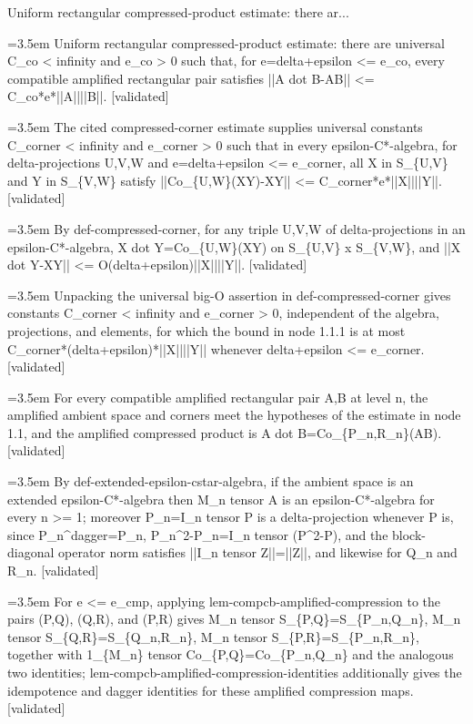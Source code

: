 \documentclass{article}
\newcommand{\step}[1]{\par\noindent\hangindent=3.5em\hangafter=1%
  \makebox[3.5em][l]{\textbf{#1.}}}
\newcommand{\steptag}[1]{\hfill{\small\textsf{[#1]}}}
\begin{document}
\begin{proofbox}{Uniform rectangular compressed-product estimate: there ar...}
\step{1} Uniform rectangular compressed-product estimate: there are universal C\_co < infinity and e\_co > 0 such that, for e=delta+epsilon <= e\_co, every compatible amplified rectangular pair satisfies ||A dot B-AB|| <= C\_co*e*||A||||B||. \steptag{validated} \\[6pt]
\step{1.1} The cited compressed-corner estimate supplies universal constants C\_corner < infinity and e\_corner > 0 such that in every epsilon-C*-algebra, for delta-projections U,V,W and e=delta+epsilon <= e\_corner, all X in S\_\{U,V\} and Y in S\_\{V,W\} satisfy ||Co\_\{U,W\}(XY)-XY|| <= C\_corner*e*||X||||Y||. \steptag{validated} \\[6pt]
\step{1.1.1} By def-compressed-corner, for any triple U,V,W of delta-projections in an epsilon-C*-algebra, X dot Y=Co\_\{U,W\}(XY) on S\_\{U,V\} x S\_\{V,W\}, and ||X dot Y-XY|| <= O(delta+epsilon)||X||||Y||. \steptag{validated} \\[4pt]
\step{1.1.2} Unpacking the universal big-O assertion in def-compressed-corner gives constants C\_corner < infinity and e\_corner > 0, independent of the algebra, projections, and elements, for which the bound in node 1.1.1 is at most C\_corner*(delta+epsilon)*||X||||Y|| whenever delta+epsilon <= e\_corner. \steptag{validated} \\[4pt]
\step{1.2} For every compatible amplified rectangular pair A,B at level n, the amplified ambient space and corners meet the hypotheses of the estimate in node 1.1, and the amplified compressed product is A dot B=Co\_\{P\_n,R\_n\}(AB). \steptag{validated} \\[6pt]
\step{1.2.1} By def-extended-epsilon-cstar-algebra, if the ambient space is an extended epsilon-C*-algebra then M\_n tensor A is an epsilon-C*-algebra for every n >= 1; moreover P\_n=I\_n tensor P is a delta-projection whenever P is, since P\_n\textasciicircum{}dagger=P\_n, P\_n\textasciicircum{}2-P\_n=I\_n tensor (P\textasciicircum{}2-P), and the block-diagonal operator norm satisfies ||I\_n tensor Z||=||Z||, and likewise for Q\_n and R\_n. \steptag{validated} \\[4pt]
\step{1.2.2} For e <= e\_cmp, applying lem-compcb-amplified-compression to the pairs (P,Q), (Q,R), and (P,R) gives M\_n tensor S\_\{P,Q\}=S\_\{P\_n,Q\_n\}, M\_n tensor S\_\{Q,R\}=S\_\{Q\_n,R\_n\}, M\_n tensor S\_\{P,R\}=S\_\{P\_n,R\_n\}, together with 1\_\{M\_n\} tensor Co\_\{P,Q\}=Co\_\{P\_n,Q\_n\} and the analogous two identities; lem-compcb-amplified-compression-identities additionally gives the idempotence and dagger identities for these amplified compression maps. \steptag{validated} \\[4pt]

\end{proofbox}
\end{document}
